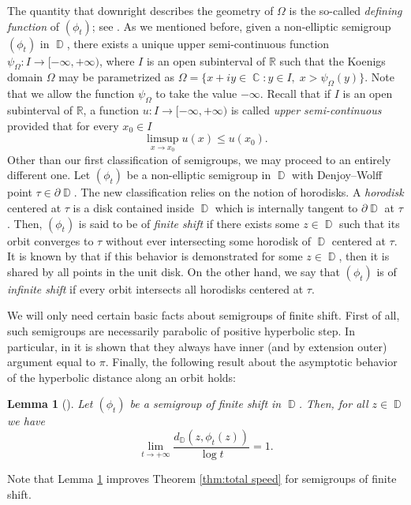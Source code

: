 \documentclass[11pt]{amsart}
\numberwithin{equation}{section}
\newtheorem{lemma}[theorem]{Lemma}
\theoremstyle{definition}
\DeclareMathOperator{\C}{\mathbb{C}}
\DeclareMathOperator{\D}{\mathbb{D}}
\begin{document}
	The quantity that downright describes the geometry of $\Omega$ is the so-called \textit{defining function} of $(\phi_t)$; see \cite[Definition 2.3]{BGGY}. As we mentioned before, given a non-elliptic semigroup $(\phi_t)$ in $\D$, there exists a unique upper semi-continuous function $\psi_\Omega:I\to[-\infty,+\infty)$, where $I$ is an open subinterval of $\mathbb{R}$ such that the Koenigs domain $\Omega$ may be parametrized as $\Omega=\{x+iy\in\C:y\in I,\; x>\psi_\Omega(y)\}$. Note that we allow the function $\psi_\Omega$ to take the value $-\infty$. Recall that if $I$ is an open subinterval of $\mathbb{R}$, a function $u:I\to[-\infty,+\infty)$ is called \textit{upper semi-continuous} provided that for every $x_0\in I$
	\begin{equation*}
		\limsup_{x\to x_0}u(x)\le u(x_0).
	\end{equation*}
	Other than our first classification of semigroups, we may proceed to an entirely different one. Let $(\phi_t)$ be a non-elliptic semigroup in $\D$ with Denjoy--Wolff point $\tau\in\partial\D$. The new classification relies on the notion of horodisks. A \textit{horodisk} centered at $\tau$ is a disk contained inside $\D$ which is internally tangent to $\partial\D$ at $\tau$. Then, $(\phi_t)$ is said to be of \textit{finite shift} if there exists some $z\in\D$ such that its orbit converges to $\tau$ without ever intersecting some horodisk of $\D$ centered at $\tau$. It is known by \cite[Lemma 17.7.4]{Booksem} that if this behavior is demonstrated for some $z\in\D$, then it is shared by all points in the unit disk. On the other hand, we say that $(\phi_t)$ is of \textit{infinite shift} if every orbit intersects all horodisks centered at $\tau$.
	
	We will only need certain basic facts about semigroups of finite shift. First of all, such semigroups are necessarily parabolic of positive hyperbolic step. In particular, in \cite[Proposition 3.2]{our_finiteshift} it is shown that they always have inner (and by extension outer) argument equal to $\pi$. Finally, the following result about the asymptotic behavior of the hyperbolic distance along an orbit holds:
	\begin{lemma}[{\cite[Corollary 4.1]{our_finiteshift}}]\label{lm:total speed finite shift}
		Let $(\phi_t)$ be a semigroup of finite shift in $\D$. Then, for all $z\in\D$ we have
		$$\lim\limits_{t\to+\infty}\dfrac{d_{\D}(z,\phi_t(z))}{\log t}=1.$$
	\end{lemma}
	Note that Lemma \ref{lm:total speed finite shift} improves Theorem \ref{thm:total speed} for semigroups of finite shift.
	
\end{document}
